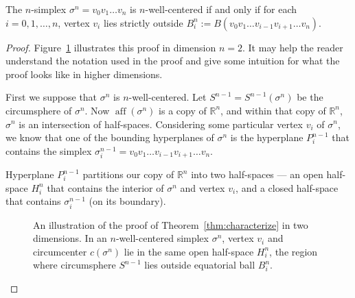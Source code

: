 \documentclass[final]{siamltex}
\newcommand{\Real}{\ensuremath{\mathbb{R}}} \newcommand{\meshM}{\ensuremath{\mathcal{M}}} \newcommand{\meshV}{\ensuremath{\mathcal{V}}} \newcommand{\meshT}{\ensuremath{\mathcal{T}}} \newcommand{\interior}{\ensuremath{\mathrm{Int}}}
\DeclareMathOperator{\aff}{aff}
\begin{document}
\begin{theorem}
\label{thm:characterize}
The $n$-simplex $\sigma^{n} = v_{0}v_{1}\ldots v_{n}$ is
$n$-well-centered if and only if for each $i = 0,1,\ldots,n$, vertex
$v_{i}$ lies strictly outside $B^{n}_{i} :=
B(v_{0}v_{1}\ldots{v}_{i-1}v_{i+1}\ldots v_{n})$.
\end{theorem}
\begin{proof}
Figure~\ref{fig:eqballsproof} illustrates this proof in dimension
  $n = 2$.  It may help the reader understand the notation used in
  the proof and give some intuition for what the proof looks like in
  higher dimensions.

  First we suppose that $\sigma^{n}$ is $n$-well-centered.  Let
  $S^{n-1} = S^{n-1}(\sigma^{n})$ be the circumsphere of $\sigma^{n}$.
  Now $\aff(\sigma^{n})$ is a copy of $\Real^{n}$, and within that
  copy of $\Real^{n}$, $\sigma^{n}$ is an intersection of half-spaces.
  Considering some particular vertex $v_{i}$ of $\sigma^{n}$, we know
  that one
of the bounding hyperplanes of $\sigma^{n}$ is the hyperplane
  $P^{n-1}_{i}$ that contains the simplex $\sigma^{n-1}_{i} =
  v_{0}v_{1}\ldots{v}_{i-1}v_{i+1}\ldots v_{n}.$


  Hyperplane $P^{n-1}_{i}$ partitions our copy of $\Real^{n}$ into two
  half-spaces --- an open half-space $H^{n}_{i}$ that contains the
  interior of $\sigma^{n}$ and vertex $v_{i}$, and a closed half-space
  that contains $\sigma^{n-1}_{i}$ (on its boundary).

  \begin{figure}
    \centering
{}
    \caption{An illustration of the proof of
      Theorem~\ref{thm:characterize} in two dimensions.  In an
      $n$-well-centered simplex $\sigma^{n}$, vertex $v_{i}$ and
      circumcenter $c(\sigma^{n})$ lie in the same open half-space
      $H^{n}_{i}$, the region where circumsphere $S^{n-1}$ lies
      outside equatorial ball $B^{n}_{i}$.}
    \label{fig:eqballsproof}
  \end{figure}


\end{proof}
\end{document}
